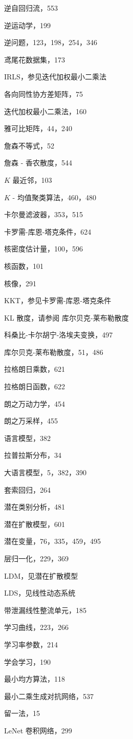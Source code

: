 \documentclass[10pt]{article}
\begin{document}
逆自回归流，553

逆运动学，199

逆问题，123，198，254，346

鸢尾花数据集，173

IRLS，参见迭代加权最小二乘法

各向同性协方差矩阵，75

迭代加权最小二乘法，160

雅可比矩阵，44，240

詹森不等式，52

詹森 - 香农散度，544

\(K\) 最近邻，103

\(K\) - 均值聚类算法，460，480

卡尔曼滤波器，353，515

卡罗需-库恩-塔克条件，624

核密度估计量，100，596

核函数，101

核像，291

KKT，参见卡罗需-库恩-塔克条件

KL 散度，请参阅 库尔贝克-莱布勒散度

科桑比-卡尔胡宁-洛埃夫变换，497

库尔贝克-莱布勒散度，51，486

拉格朗日乘数，621

拉格朗日函数，622

朗之万动力学，454

朗之万采样，455

语言模型，382

拉普拉斯分布，34

大语言模型，5，382，390

套索回归，264

潜在类别分析，481

潜在扩散模型，601

潜在变量，76，335，459，495

层归一化，229，369

LDM，见潜在扩散模型

LDS，见线性动态系统

带泄漏线性整流单元，185

学习曲线，223，266

学习率参数，214

学会学习，190

最小均方算法，118

最小二乘生成对抗网络，537

留一法，15

LeNet 卷积网络，299
\end{document}
